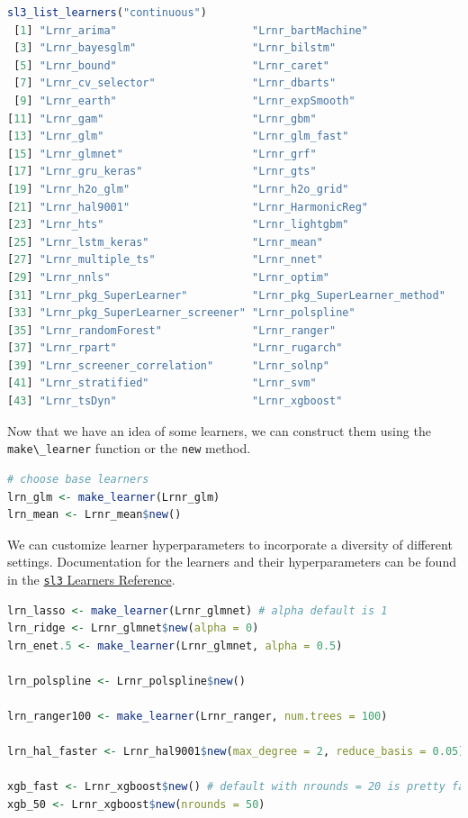\documentclass[12pt, krantz2,]{krantz}
\newcommand{\passthrough}[1]{#1}
\theoremstyle{definition}
\theoremstyle{definition}
\theoremstyle{definition}
\newcommand{\1}{\mathbbm{1}}
\begin{document}
\begin{lstlisting}[language=R]
sl3_list_learners("continuous")
 [1] "Lrnr_arima"                     "Lrnr_bartMachine"              
 [3] "Lrnr_bayesglm"                  "Lrnr_bilstm"                   
 [5] "Lrnr_bound"                     "Lrnr_caret"                    
 [7] "Lrnr_cv_selector"               "Lrnr_dbarts"                   
 [9] "Lrnr_earth"                     "Lrnr_expSmooth"                
[11] "Lrnr_gam"                       "Lrnr_gbm"                      
[13] "Lrnr_glm"                       "Lrnr_glm_fast"                 
[15] "Lrnr_glmnet"                    "Lrnr_grf"                      
[17] "Lrnr_gru_keras"                 "Lrnr_gts"                      
[19] "Lrnr_h2o_glm"                   "Lrnr_h2o_grid"                 
[21] "Lrnr_hal9001"                   "Lrnr_HarmonicReg"              
[23] "Lrnr_hts"                       "Lrnr_lightgbm"                 
[25] "Lrnr_lstm_keras"                "Lrnr_mean"                     
[27] "Lrnr_multiple_ts"               "Lrnr_nnet"                     
[29] "Lrnr_nnls"                      "Lrnr_optim"                    
[31] "Lrnr_pkg_SuperLearner"          "Lrnr_pkg_SuperLearner_method"  
[33] "Lrnr_pkg_SuperLearner_screener" "Lrnr_polspline"                
[35] "Lrnr_randomForest"              "Lrnr_ranger"                   
[37] "Lrnr_rpart"                     "Lrnr_rugarch"                  
[39] "Lrnr_screener_correlation"      "Lrnr_solnp"                    
[41] "Lrnr_stratified"                "Lrnr_svm"                      
[43] "Lrnr_tsDyn"                     "Lrnr_xgboost"                  
\end{lstlisting}

Now that we have an idea of some learners, we can construct them using the
\passthrough{\lstinline!make\_learner!} function or the \passthrough{\lstinline!new!} method.

\begin{lstlisting}[language=R]
# choose base learners
lrn_glm <- make_learner(Lrnr_glm)
lrn_mean <- Lrnr_mean$new()
\end{lstlisting}

We can customize learner hyperparameters to incorporate a diversity of
different settings. Documentation for the learners and their hyperparameters
can be found in the \href{https://tlverse.org/sl3/reference/index.html\#section-sl-learners}{\passthrough{\lstinline!sl3!} Learners
Reference}.

\begin{lstlisting}[language=R]
lrn_lasso <- make_learner(Lrnr_glmnet) # alpha default is 1
lrn_ridge <- Lrnr_glmnet$new(alpha = 0)
lrn_enet.5 <- make_learner(Lrnr_glmnet, alpha = 0.5)

lrn_polspline <- Lrnr_polspline$new()

lrn_ranger100 <- make_learner(Lrnr_ranger, num.trees = 100)

lrn_hal_faster <- Lrnr_hal9001$new(max_degree = 2, reduce_basis = 0.05)

xgb_fast <- Lrnr_xgboost$new() # default with nrounds = 20 is pretty fast
xgb_50 <- Lrnr_xgboost$new(nrounds = 50)
\end{lstlisting}
\end{document}
